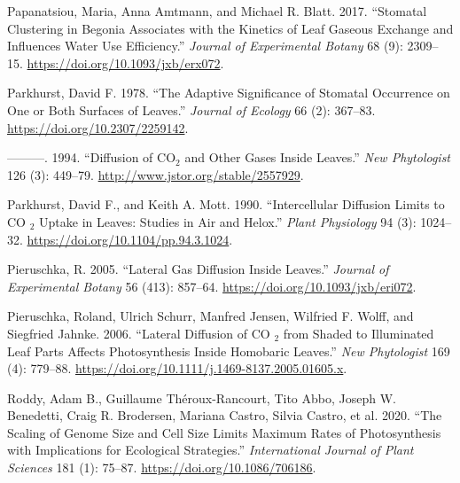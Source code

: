 \documentclass[12pt,halfline,a4paper,]{ouparticle}
\newlength{\cslhangindent}
\newlength{\cslentryspacingunit} %
\newenvironment{CSLReferences}[2] %
 {%
  \setlength{\parindent}{0pt}
  \ifodd #1
  \let\oldpar\par
  \def\par{\hangindent=\cslhangindent\oldpar}
  \fi
  \setlength{\parskip}{#2\cslentryspacingunit}
 }%
 {}
\begin{document}
\begin{CSLReferences}{1}{0}
\leavevmode{}%
Papanatsiou, Maria, Anna Amtmann, and Michael R. Blatt. 2017.
{``Stomatal Clustering in {Begonia} Associates with the Kinetics of Leaf
Gaseous Exchange and Influences Water Use Efficiency.''} \emph{Journal
of Experimental Botany} 68 (9): 2309--15.
\url{https://doi.org/10.1093/jxb/erx072}.

\leavevmode{}%
Parkhurst, David F. 1978. {``The {Adaptive} {Significance} of {Stomatal}
{Occurrence} on {One} or {Both} {Surfaces} of {Leaves}.''} \emph{Journal
of Ecology} 66 (2): 367--83. \url{https://doi.org/10.2307/2259142}.

\leavevmode{}%
---------. 1994. {``Diffusion of {CO}\(_{\textrm{2}}\) and Other Gases
Inside Leaves.''} \emph{New Phytologist} 126 (3): 449--79.
\url{http://www.jstor.org/stable/2557929}.

\leavevmode{}%
Parkhurst, David F., and Keith A. Mott. 1990. {``Intercellular
{Diffusion} {Limits} to {CO} \(_{\textrm{2}}\) {Uptake} in {Leaves}:
{Studies} in {Air} and {Helox}.''} \emph{Plant Physiology} 94 (3):
1024--32. \url{https://doi.org/10.1104/pp.94.3.1024}.

\leavevmode{}%
Pieruschka, R. 2005. {``Lateral Gas Diffusion Inside Leaves.''}
\emph{Journal of Experimental Botany} 56 (413): 857--64.
\url{https://doi.org/10.1093/jxb/eri072}.

\leavevmode{}%
Pieruschka, Roland, Ulrich Schurr, Manfred Jensen, Wilfried F. Wolff,
and Siegfried Jahnke. 2006. {``Lateral Diffusion of {CO}
\(_{\textrm{2}}\) from Shaded to Illuminated Leaf Parts Affects
Photosynthesis Inside Homobaric Leaves.''} \emph{New Phytologist} 169
(4): 779--88. \url{https://doi.org/10.1111/j.1469-8137.2005.01605.x}.

\leavevmode{}%
Roddy, Adam B., Guillaume Théroux-Rancourt, Tito Abbo, Joseph W.
Benedetti, Craig R. Brodersen, Mariana Castro, Silvia Castro, et al.
2020. {``The {Scaling} of {Genome} {Size} and {Cell} {Size} {Limits}
{Maximum} {Rates} of {Photosynthesis} with {Implications} for
{Ecological} {Strategies}.''} \emph{International Journal of Plant
Sciences} 181 (1): 75--87. \url{https://doi.org/10.1086/706186}.


\end{CSLReferences}
\end{document}
